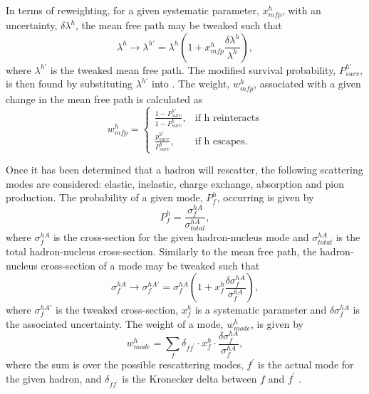 In terms of reweighting, for a given systematic parameter, $x^h_{mfp}$, with an uncertainty, $\delta \lambda^h$, the mean free path may be tweaked such that
\begin{equation}
    \lambda^h \rightarrow \lambda^{h\prime} = \lambda^h \left(1 + x^h_{mfp} \frac{\delta \lambda^h}{\lambda^h} \right),
\end{equation}
where $\lambda^{h\prime}$ is the tweaked mean free path. The modified survival probability, $P_{surv}^{h\prime}$, is then found by substituting $\lambda^{h\prime}$ into . The weight, $w^h_{mfp}$, associated with a given change in the mean free path is calculated as \cite{GENIE_manual}
\begin{equation}
  w^h_{mfp}=\begin{cases}
    \frac{1-P^{h\prime}_{surv}}{1-P^h_{surv}}, & \text{if h reinteracts}\\
    \frac{p^{h\prime}_{surv}}{P^{h}_{surv}}, & \text{if h escapes}.
  \end{cases}
\end{equation}

Once it has been determined that a hadron will rescatter, the following scattering modes are considered: elastic, inelastic, charge exchange, absorption and pion production. The probability of a given mode, $P_f^h$, occurring is given by
\begin{equation}
    P_f^h = \frac{\sigma_f^{hA}}{\sigma_{total}^{hA}},
\end{equation}
where $\sigma_f^{hA}$ is the cross-section for the given hadron-nucleus mode and $\sigma_{total}^{hA}$ is the total hadron-nucleus cross-section. Similarly to the mean free path, the hadron-nucleus cross-section of a mode may be tweaked such that
\begin{equation}
    \sigma_f^{hA} \rightarrow \sigma_f^{hA\prime} = \sigma_f^{hA}\left(1 + x_f^h \frac{\delta\sigma_f^{hA}}{\sigma_f^{hA}}\right),
\end{equation}
where $\sigma_f^{hA\prime}$ is the tweaked cross-section, $x_f^h$ is a systematic parameter and $\delta\sigma_f^{hA}$ is the associated uncertainty. The weight of a mode, $w^h_{mode}$, is given by
\begin{equation}
    w^h_{mode} = \sum_f \delta_{ff^\prime} \cdot x^h_f \cdot \frac{\delta \sigma_f^{hA}}{\sigma_f^{hA}},
\end{equation}
where the sum is over the possible rescattering modes, $f^\prime$ is the actual mode for the given hadron, and $\delta_{ff^\prime}$ is the Kronecker delta between $f$ and $f^\prime$ \cite{GENIE_manual}. 

